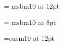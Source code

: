 \let\bsbf=\bf
\let\bsit=\it
\let\bs=\rm
{}
\def\baselinestretch{1.5}
\def\triangulo{\hbox{.\kern2pt.\kern-5pt\raise 4pt\hbox{.}}\kern 5pt}
\font\gordas = msbm10 at 12pt

\font\gorditas = msbm10 at 8pt

\def\bbb#1{\hbox {{\gordas #1}}}

\def\bbba#1{\hbox {{\gorditas #1}}}


\def\a{{\bbb A}}
\def\be{{\bbb B}}
\def\ce{{\bbb C}}
\def\ache{{\bbb H}}
\def\o{{\bbb O}}
\def\erre{{\bbb R}}
\font\gar=eusm10 at 12pt
\def\fgar{\hbox{\gar F}}
\def\ggar{\hbox{\gar G}}
\def\mgar{\hbox{\gar M}}
\def\rgar{\hbox{\gar R}}
\def\thefootnote{}

